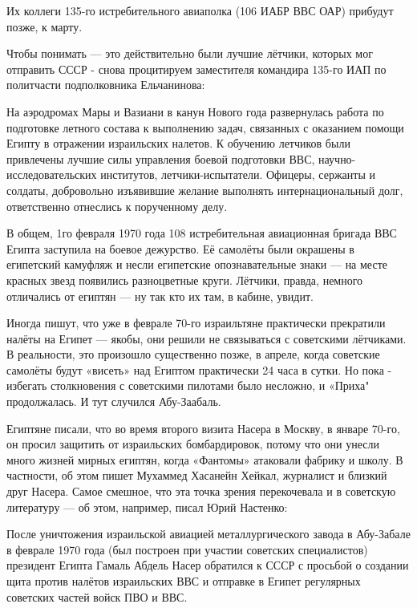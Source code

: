 Их коллеги 135-го истребительного авиаполка (106 ИАБР ВВС ОАР) прибудут позже, к марту.

Чтобы понимать — это действительно были лучшие лётчики, которых мог отправить СССР - снова процитируем заместителя командира 135-го ИАП по политчасти подполковника Ельчанинова:

\begin{textcitation}
	На аэродромах Мары и Вазиани в канун Нового года развернулась работа по подготовке летного состава к выполнению задач, связанных с оказанием помощи Египту в отражении израильских налетов. К обучению летчиков были привлечены лучшие силы управления боевой подготовки ВВС, научно-исследовательских институтов, летчики-испытатели. Офицеры, сержанты и солдаты, добровольно изъявившие желание выполнять интернациональный долг, ответственно отнеслись к порученному делу.
\end{textcitation}

В общем, 1го февраля 1970 года 108 истребительная авиационная бригада ВВС Египта заступила на боевое дежурство. Её самолёты были окрашены в египетский камуфляж и несли египетские опознавательные знаки — на месте красных звезд появились разноцветные круги. Лётчики, правда, немного отличались от египтян — ну так кто их там, в кабине, увидит.

Иногда пишут, что уже в феврале 70-го израильтяне практически прекратили налёты на Египет — якобы, они решили не связываться с советскими лётчиками. В реальности, это произошло существенно позже, в апреле, когда советские самолёты будут «висеть» над Египтом практически 24 часа в сутки. Но пока - избегать столкновения с советскими пилотами было несложно, и «Приха" продолжалась. И тут случился Абу-Заабаль.

Египтяне писали, что во время второго визита Насера в Москву, в январе 70-го, он просил защитить от израильских бомбардировок, потому что они унесли много жизней мирных египтян, когда «Фантомы» атаковали фабрику и школу. В частности, об этом пишет Мухаммед Хасанейн Хейкал, журналист и близкий друг Насера. Самое смешное, что эта точка зрения перекочевала и в советскую литературу — об этом, например, писал Юрий Настенко:

\begin{textcitation}
	После уничтожения израильской авиацией металлургического завода в Абу-Забале в феврале 1970 года (был построен при участии советских специалистов) президент Египта Гамаль Абдель Насер обратился к СССР с просьбой о создании щита против налётов израильских ВВС и отправке в Египет регулярных советских частей войск ПВО и ВВС.
\end{textcitation}

